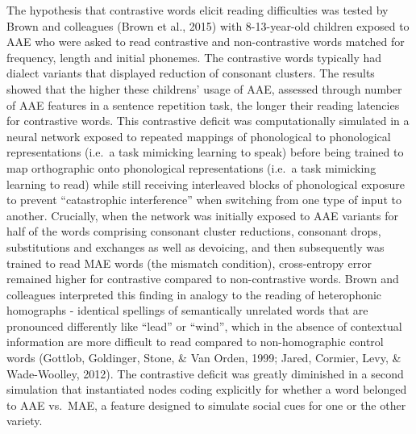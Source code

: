 \documentclass[doc,floatsintext]{apa6}
\begin{document}
The hypothesis that contrastive words elicit reading difficulties was
tested by Brown and colleagues (Brown et al., 2015) with 8-13-year-old
children exposed to AAE who were asked to read contrastive and
non-contrastive words matched for frequency, length and initial
phonemes. The contrastive words typically had dialect variants that
displayed reduction of consonant clusters. The results showed that the
higher these childrens' usage of AAE, assessed through number of AAE
features in a sentence repetition task, the longer their reading
latencies for contrastive words. This contrastive deficit was
computationally simulated in a neural network exposed to repeated
mappings of phonological to phonological representations (i.e.~a task
mimicking learning to speak) before being trained to map orthographic
onto phonological representations (i.e.~a task mimicking learning to
read) while still receiving interleaved blocks of phonological exposure
to prevent \enquote{catastrophic interference} when switching from one
type of input to another. Crucially, when the network was initially
exposed to AAE variants for half of the words comprising consonant
cluster reductions, consonant drops, substitutions and exchanges as well
as devoicing, and then subsequently was trained to read MAE words (the
mismatch condition), cross-entropy error remained higher for contrastive
compared to non-contrastive words. Brown and colleagues interpreted this
finding in analogy to the reading of heterophonic homographs - identical
spellings of semantically unrelated words that are pronounced
differently like \enquote{lead} or \enquote{wind}, which in the absence
of contextual information are more difficult to read compared to
non-homographic control words (Gottlob, Goldinger, Stone, \& Van Orden,
1999; Jared, Cormier, Levy, \& Wade-Woolley, 2012). The contrastive
deficit was greatly diminished in a second simulation that instantiated
nodes coding explicitly for whether a word belonged to AAE vs.~MAE, a
feature designed to simulate social cues for one or the other variety.
\end{document}
